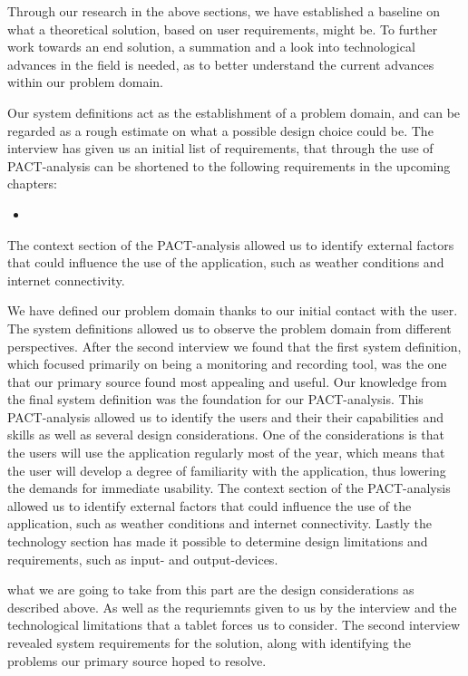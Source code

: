 Through our research in the above sections, we have established a baseline on what a theoretical solution, based on user requirements, might be. To further work towards an end solution, a summation and a look into technological advances in the field is needed, as to better understand the current advances within our problem domain.

Our system definitions act as the establishment of a problem domain, and can be regarded as a rough estimate on what a possible design choice could be. 
The interview has given us an initial list of requirements, that through the use of PACT-analysis can be shortened to the following requirements in the upcoming chapters:

\begin{itemize}
    \item 
\end{itemize}

The context section of the PACT-analysis allowed us to identify external factors that could influence the use of the application, such as weather conditions and internet connectivity.



We have defined our problem domain thanks to our initial contact with the user. The system definitions allowed us to observe the problem domain from different perspectives. After the second interview we found that the first system definition, which focused primarily on being a monitoring and recording tool, was the one that our primary source found most appealing and useful.
Our knowledge from the final system definition was the foundation for our PACT-analysis. This PACT-analysis allowed us to identify the users and their their capabilities and skills as well as several design considerations. One of the considerations is that the users will use the application regularly most of the year, which means that the user will develop a degree of familiarity with the application, thus lowering the demands for immediate usability. The context section of the PACT-analysis allowed us to identify external factors that could influence the use of the application, such as weather conditions and internet connectivity. Lastly the technology section has made it possible to determine design limitations and requirements, such as input- and output-devices.

what we are going to take from this part are the design considerations as described above. As well as the requriemnts given to us by the interview and the technological limitations that a tablet forces us to consider.
The second interview revealed system requirements for the solution, along with identifying the problems our primary source hoped to resolve.



